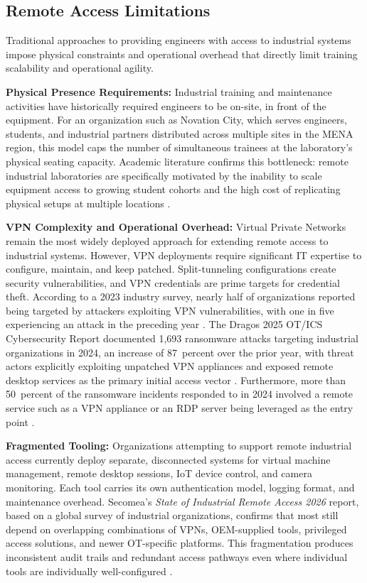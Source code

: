 \subsection{Remote Access Limitations}

Traditional approaches to providing engineers with access to industrial systems
impose physical constraints and operational overhead that directly limit training
scalability and operational agility.

\textbf{Physical Presence Requirements:} Industrial training and maintenance
activities have historically required engineers to be on-site, in front of the
equipment. For an organization such as Novation City, which serves engineers,
students, and industrial partners distributed across multiple sites in the MENA
region, this model caps the number of simultaneous trainees at the laboratory's
physical seating capacity. Academic literature confirms
this bottleneck: remote industrial laboratories are specifically motivated by
the inability to scale equipment access to growing student cohorts and the high
cost of replicating physical setups at multiple locations
{\footnotesize\cite{sciencedirect-remote-lab-2024,remote-lab-acm-2021}}.

\textbf{VPN Complexity and Operational Overhead:} Virtual Private Networks
remain the most widely deployed approach for extending remote access to
industrial systems. However, VPN deployments require significant IT expertise
to configure, maintain, and keep patched. Split-tunneling configurations create
security vulnerabilities, and VPN credentials are prime targets for credential
theft. According to a 2023 industry survey, nearly half of organizations reported
being targeted by attackers exploiting VPN vulnerabilities, with one in five
experiencing an attack in the preceding year
{\footnotesize\cite{vpn-risk-survey-2023}}. The Dragos 2025 OT/ICS Cybersecurity
Report documented 1,693 ransomware attacks targeting industrial organizations
in 2024, an increase of 87~percent over the prior year, with threat actors
explicitly exploiting unpatched VPN appliances and exposed remote desktop
services as the primary initial access vector
{\footnotesize\cite{dragos-ot-2025}}. Furthermore, more than 50~percent of
the ransomware incidents responded to in 2024 involved a remote service such
as a VPN appliance or an RDP server being leveraged as the entry point
{\footnotesize\cite{beyondtrust-ot-2025}}.

\textbf{Fragmented Tooling:} Organizations attempting to support remote industrial
access currently deploy separate, disconnected systems for virtual machine
management, remote desktop sessions, IoT device control, and camera monitoring.
Each tool carries its own authentication model, logging format, and maintenance
overhead. Secomea's \textit{State of Industrial Remote Access 2026} report, based
on a global survey of industrial organizations, confirms that most still depend on
overlapping combinations of VPNs, OEM-supplied tools, privileged access solutions,
and newer OT-specific platforms. This fragmentation produces inconsistent audit
trails and redundant access pathways even where individual tools are individually
well-configured {\footnotesize\cite{secomea-state-2026}}.

